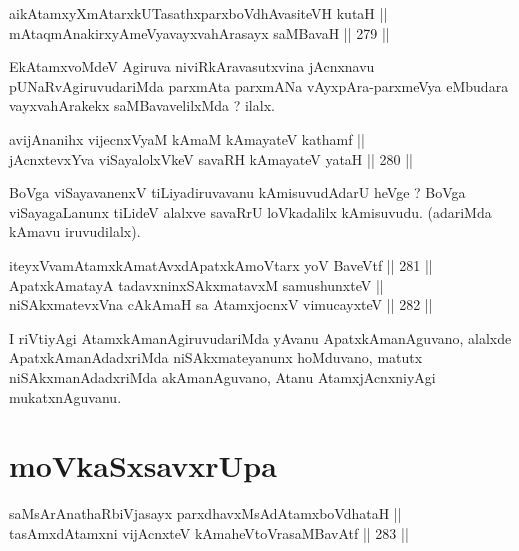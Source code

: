 
\begin{shl}
aikAtamxyXmAtarxkUTasathxparxboVdhAvasiteVH kutaH || \\
mAtaqmAnakirxyAmeVyavayxvahArasayx saMBavaH \hfill || 279 ||  
\end{shl}

\begin{artha}
EkAtamxvoMdeV Agiruva niviRkAravasutxvina jAcnxnavu
pUNaRvAgiruvudariMda parxmAta parxmANa vAyxpAra-parxmeVya eMbudara
vayxvahArakekx saMBavavelilxMda ? ilalx.
\end{artha}


\begin{shl}
avijAnanihx vijecnxVyaM kAmaM kAmayateV kathamf || \\
jAcnxtevxYva viSayalolxVkeV savaRH kAmayateV yataH \hfill || 280 ||  
\end{shl}

\begin{artha}
BoVga viSayavanenxV tiLiyadiruvavanu kAmisuvudAdarU heVge ? BoVga
viSayagaLanunx tiLideV alalxve savaRrU loVkadalilx kAmisuvudu.
(adariMda kAmavu iruvudilalx).
\end{artha}

\begin{shl}
iteyxVvamAtamxkAmatAvxdApatxkAmoV\s tarx yoV BaveVtf \hfill || 281 ||  \\
ApatxkAmatayA tadavxninxSAkxmatavxM samushunxteV || \\
niSAkxmatevxVna cAkAmaH sa AtamxjocnxV vimucayxteV \hfill || 282 ||  
\end{shl}

\begin{artha}
I riVtiyAgi AtamxkAmanAgiruvudariMda yAvanu ApatxkAmanAguvano, alalxde
ApatxkAmanAdadxriMda niSAkxmateyanunx hoMduvano, matutx
niSAkxmanAdadxriMda akAmanAguvano, Atanu AtamxjAcnxniyAgi
mukatxnAguvanu.
\end{artha}


\section*{moVkaSxsavxrUpa}

\begin{shl}
saMsArAnathaRbiVjasayx parxdhavxMsAdAtamxboVdhataH || \\
tasAmxdAtamxni vijAcnxteV kAmaheVtoVrasaMBavAtf \hfill || 283 ||  
\end{shl}

